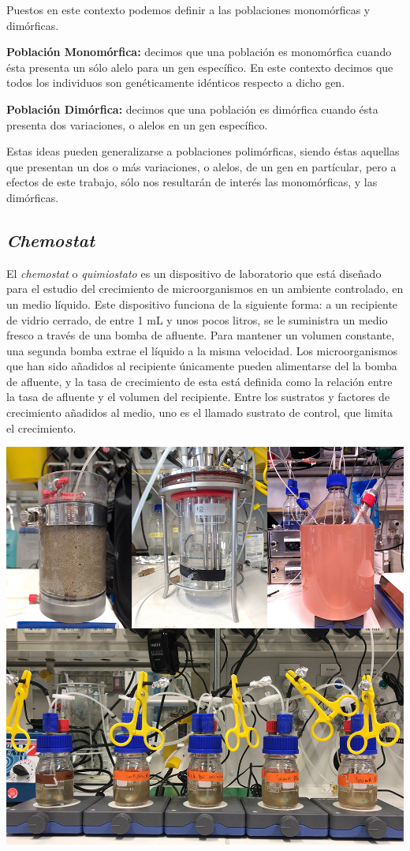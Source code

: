 Puestos en este contexto podemos definir a las poblaciones monomórficas y dimórficas.

\textbf{Población Monomórfica:} decimos que una población es monomórfica cuando ésta presenta un sólo alelo para un gen específico. En este contexto decimos que todos los individuos son genéticamente idénticos respecto a dicho gen.

\textbf{Población Dimórfica:} decimos que una población es dimórfica cuando ésta presenta dos variaciones, o alelos en un gen específico.

Estas ideas pueden generalizarse a poblaciones polimórficas, siendo éstas aquellas que presentan un dos o más variaciones, o alelos, de un gen en partícular, pero a efectos de este trabajo, sólo nos resultarán de interés las monomórficas, y las dimórficas.

\subsection{\textit{Chemostat}}

El \textit{chemostat} o \textit{quimiostato} es un dispositivo de laboratorio que está diseñado para el estudio del crecimiento de microorganismos en un ambiente controlado, en un medio líquido. Este dispositivo funciona de la siguiente forma: a un recipiente de vidrio cerrado, de entre 1 mL y unos pocos litros, se le suministra un medio fresco a través de una bomba de afluente. Para mantener un volumen constante, una segunda bomba extrae el líquido a la misma velocidad. Los microorganismos que han sido añadidos al recipiente únicamente pueden alimentarse del la bomba de afluente, y la tasa de crecimiento de esta está definida como la relación entre la tasa de afluente y el volumen del recipiente. Entre los sustratos y factores de crecimiento añadidos al medio, uno es el llamado sustrato de control, que limita el crecimiento.

\begin{center}
	\includegraphics[scale=0.2]{Chemostat.jpg}
\end{center}

